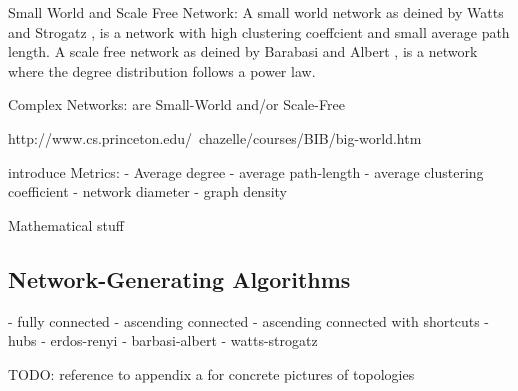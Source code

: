 \documentclass[../Bachelorarbeit.tex]{subfiles}
\begin{document}
Small World and Scale Free Network: A small world network as deined by Watts and Strogatz \cite{WattsStrogatz_DynamicsSmallWorld}, is a network with high clustering coeffcient and small average path length. A scale free network as deined by Barabasi and Albert \citep{BarabasiAlbert_EmergenceScaling}, is a network where the degree distribution follows a power law.

Complex Networks: are Small-World and/or Scale-Free \citep{BarratWeigt_PropertiesSmallWorld} \citep{AmaralScalaStanley_ClassesSmallWorld}

\citep {Kleinfeld_BigWorld}
http://www.cs.princeton.edu/~chazelle/courses/BIB/big-world.htm

introduce Metrics:
- Average degree
- average path-length
- average clustering coefficient
- network diameter
- graph density

Mathematical stuff 
\citep{Newman_Eigenvectors}
\citep{AielloChungLu_RandomEvolution}
\citep{EbelMielschBornholdt_TopologyEmail}
\citep{GaertlerPatrignani_AutonomousSystem}

\subsection{Network-Generating Algorithms}
- fully connected
- ascending connected
- ascending connected with shortcuts
- hubs
- erdos-renyi
- barbasi-albert
- watts-strogatz

TODO: reference to appendix a for concrete pictures of topologies
\end{document}
